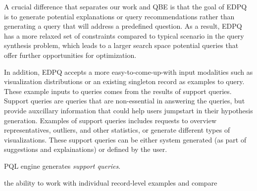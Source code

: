 \documentclass{sig-alternate-05-2015}
\begin{document}
\par A crucial difference that separates our work and QBE is that the goal of EDPQ is to generate potential explanations or query recommendations rather than generating a query that will address a predefined question. As a result, EDPQ has a more relaxed set of constraints compared to typical scenario in the query synthesis problem, which leads to a larger search space potential queries that offer further opportunities for optimization.
\par In addition, EDPQ accepts a more easy-to-come-up-with input modalities such as visualization distributions or an existing singleton record as examples to query. These example inputs to queries comes from the results of support queries. Support queries are queries that are non-essential in answering the queries, but provide auxcillary information that could help users jumpstart in their hypothesis generation. Examples of support queries includes requests to overview representatives, outliers, and other statistics, or generate different types of visualizations. These support queries can be either system generated (as part of suggestions and explainations) or defined by the user. 




 PQL engine generates \textit{support queries}.

the ability to work with individual record-level examples and compare 



 

  
\end{document}
